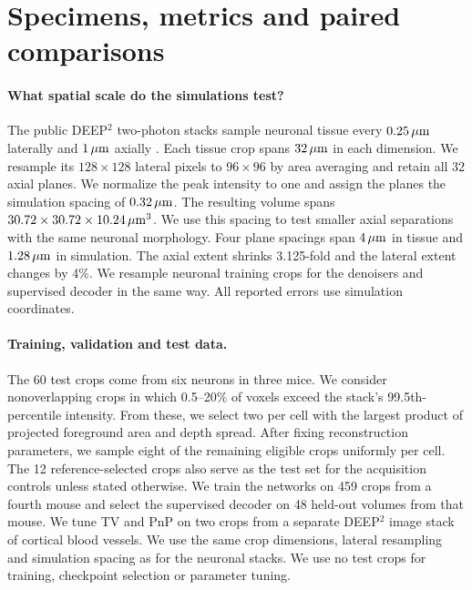 \section{Specimens, metrics and paired comparisons}
\label{sec:s:evaluation}

\paragraph{What spatial scale do the simulations test?}
The public DEEP$^2$ two-photon stacks sample neuronal tissue every $0.25\,\mu\mathrm{m}$ laterally and $1\,\mu\mathrm{m}$ axially \cite{wijethilake2023,wijethilake2023data}. Each tissue crop spans $32\,\mu\mathrm{m}$ in each dimension. We resample its $128\times128$ lateral pixels to $96\times96$ by area averaging and retain all 32 axial planes. We normalize the peak intensity to one and assign the planes the simulation spacing of $0.32\,\mu\mathrm{m}$. The resulting volume spans $30.72\times30.72\times10.24\,\mu\mathrm{m}^3$. We use this spacing to test smaller axial separations with the same neuronal morphology. Four plane spacings span $4\,\mu\mathrm{m}$ in tissue and $1.28\,\mu\mathrm{m}$ in simulation. The axial extent shrinks 3.125-fold and the lateral extent changes by 4\%. We resample neuronal training crops for the denoisers and supervised decoder in the same way. All reported errors use simulation coordinates.

\paragraph{Training, validation and test data.}
The 60 test crops come from six neurons in three mice. We consider nonoverlapping crops in which 0.5--20\% of voxels exceed the stack's 99.5th-percentile intensity. From these, we select two per cell with the largest product of projected foreground area and depth spread. After fixing reconstruction parameters, we sample eight of the remaining eligible crops uniformly per cell. The 12 reference-selected crops also serve as the test set for the acquisition controls unless stated otherwise. We train the networks on 459 crops from a fourth mouse and select the supervised decoder on 48 held-out volumes from that mouse. We tune TV and PnP on two crops from a separate DEEP$^2$ image stack of cortical blood vessels. We use the same crop dimensions, lateral resampling and simulation spacing as for the neuronal stacks. We use no test crops for training, checkpoint selection or parameter tuning.

